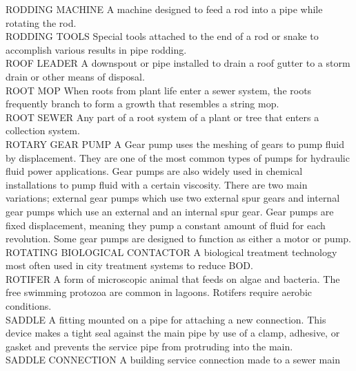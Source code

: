 RODDING MACHINE
A machine designed to feed a rod into a pipe while rotating the rod.
\vspace{0.3cm}\\
RODDING TOOLS
Special tools attached to the end of a rod or snake to accomplish various results in pipe rodding. 
\vspace{0.3cm}\\
ROOF LEADER
A downspout or pipe installed to drain a roof gutter to a storm drain or other means of disposal. 
\vspace{0.3cm}\\
ROOT MOP
When roots from plant life enter a sewer system, the roots frequently branch to form a growth that resembles a string mop. 
\vspace{0.3cm}\\
ROOT SEWER
Any part of a root system of a plant or tree that enters a collection system. 
\vspace{0.3cm}\\
ROTARY GEAR PUMP
A Gear pump uses the meshing of gears to pump fluid by displacement. They are one of the most common types of pumps for hydraulic fluid power applications. Gear pumps are also widely used in chemical installations to pump fluid with a certain viscosity. There are two main variations; external gear pumps which use two external spur gears and internal gear pumps which use an external and an internal spur gear. Gear pumps are fixed displacement, meaning they pump a constant amount of fluid for each revolution. Some gear pumps are designed to function as either a motor or pump.
\vspace{0.3cm}\\
ROTATING BIOLOGICAL CONTACTOR
A biological treatment technology most often used in city treatment systems to reduce BOD.
\vspace{0.3cm}\\
ROTIFER
A form of microscopic animal that feeds on algae and bacteria. The free swimming protozoa are common in lagoons. Rotifers require aerobic conditions.
\vspace{0.3cm}\\
SADDLE
A fitting mounted on a pipe for attaching a new connection. This device makes a tight seal against the main pipe by use of a clamp, adhesive, or gasket and prevents the service pipe from protruding into the main. 
\vspace{0.3cm}\\
SADDLE CONNECTION
A building service connection made to a sewer main 
\vspace{0.3cm}\\
